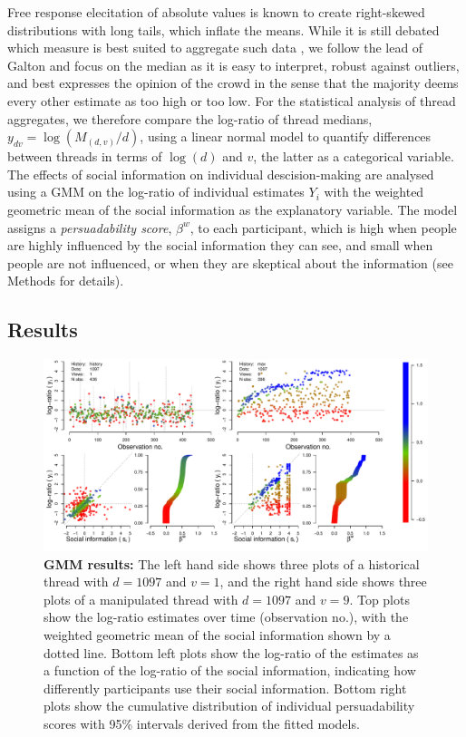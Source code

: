 \documentclass[9pt,a4paper,twocolumn,lineno]{article}
\begin{document}
Free response elecitation of absolute values is known to create right-skewed distributions with long tails, which inflate the means. While it is still debated which measure is best suited to aggregate such data \cite{kao2018counteracting}, we follow the lead of Galton \cite{galton1907vox} and focus on the median as it is easy to interpret, robust against outliers, and best expresses the opinion of the crowd in the sense that the majority deems every other estimate as too high or too low. For the statistical analysis of thread aggregates, we therefore compare the log-ratio of thread medians, $y_{dv}=\log(M_{(d,v)}/d)$, using a linear normal model to quantify differences between threads in terms of $\log(d)$ and $v$, the latter as a categorical variable. The effects of social information on individual descision-making are analysed using a GMM on the log-ratio of individual estimates $Y_i$ with the weighted geometric mean of the social information as the explanatory variable. %
The model assigns a \textit{persuadability score}, $\beta^w$, to each participant, which is high when people are highly influenced by the social information they can see, and small when people are not influenced, or when they are skeptical about the information (see Methods for details).

\subsection*{Results}
\begin{figure}[h]
	\centering
		\includegraphics[width=1\linewidth]{threads.pdf}
		\caption{\footnotesize \textbf{GMM results:} The left hand side shows three plots of a historical thread with $d=1097$ and $v=1$, and the right hand side shows three plots of a manipulated thread with $d=1097$ and $v=9$. Top plots show the log-ratio estimates over time (observation no.), with the weighted geometric mean of the social information shown by a dotted line. Bottom left plots show the log-ratio of the estimates as a function of the log-ratio of the social information, indicating how differently participants use their social information. Bottom right plots show the cumulative distribution of individual persuadability scores with 95\% intervals derived from the fitted models.}
\label{fig: social influence}
\end{figure}
\end{document}
